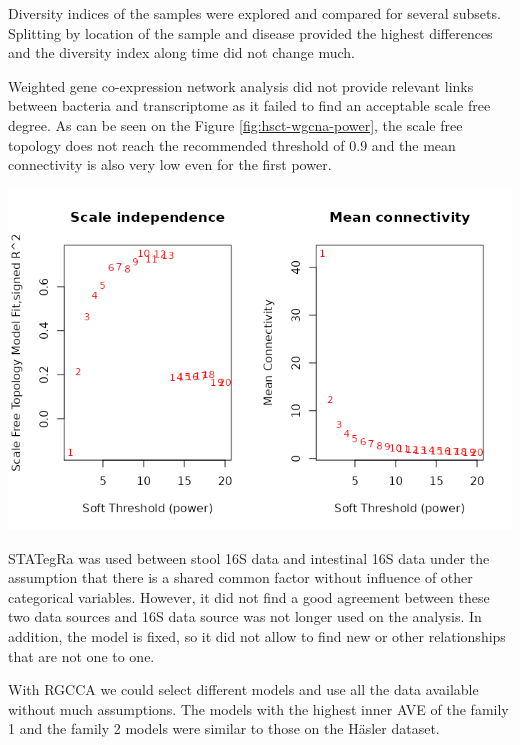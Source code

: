 \documentclass[
  a4paper,
]{book}
\let\origfigure\figure
\let\endorigfigure\endfigure
\renewenvironment{figure}[1][2] {
    \expandafter\origfigure\expandafter[!ht]
} {
    \endorigfigure
}
\begin{document}
Diversity indices of the samples were explored and compared for several subsets.
Splitting by location of the sample and disease provided the highest differences and the diversity index along time did not change much.

Weighted gene co-expression network analysis did not provide relevant links between bacteria and transcriptome as it failed to find an acceptable scale free degree.
As can be seen on the Figure \ref{fig:hsct-wgcna-power}, the scale free topology does not reach the recommended threshold of 0.9 and the mean connectivity is also very low even for the first power.

\begin{figure}
\centering
\includegraphics{images/hsct-wgcna-power.png}
\caption{\label{fig:hsct-wgcna-power} Power evaluation of WGCNA of the HSCT dataset. On the ordinate the power on the abscissa on the left the scale free topology model fit; on the right the mean connectivity. There is a low fit even on large power and the mean connectivity is below 100 from the very first value.}
\end{figure}

STATegRa was used between stool 16S data and intestinal 16S data under the assumption that there is a shared common factor without influence of other categorical variables.
However, it did not find a good agreement between these two data sources and 16S data source was not longer used on the analysis.
In addition, the model is fixed, so it did not allow to find new or other relationships that are not one to one.

With RGCCA we could select different models and use all the data available without much assumptions.
The models with the highest inner AVE of the family 1 and the family 2 models were similar to those on the Häsler dataset.
\end{document}
